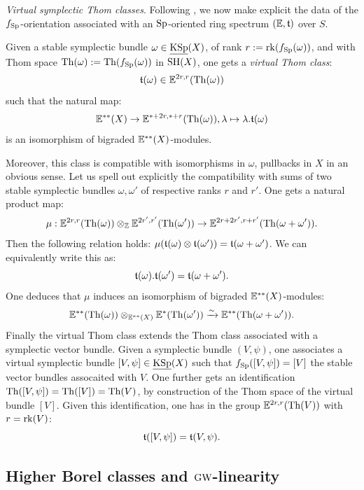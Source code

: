 \begin{num}\textit{Virtual symplectic Thom classes}.
Following ,
 we now make explicit the data of the $f_{\mathrm{Sp}}$-orientation
 associated with an $\mathrm{Sp}$-oriented ring spectrum $(\mathbb E,\mathfrak{t})$ over $S$.

Given a stable symplectic bundle $\omega \in \operatorname{\underline{KSp}}(X)$,
 of rank $r:=\operatorname{rk}(f_{\mathrm{Sp}}(\omega))$, and with Thom space $\operatorname{Th}(\omega):=\operatorname{Th}(f_{\mathrm{Sp}}(\omega))$ in $\operatorname{SH}(X)$,
 one gets a \emph{virtual Thom class}:
$$
\mathfrak{t}(\omega) \in \mathbb E^{2r,r}(\operatorname{Th}(\omega))
$$
such that the natural map:
$$
\mathbb E^{**}(X) \rightarrow \mathbb E^{*+2r,*+r}(\operatorname{Th}(\omega)), \lambda \mapsto \lambda.\mathfrak{t}(\omega)
$$
is an isomorphism of bigraded $\mathbb E^{**}(X)$-modules.

Moreover, this class is compatible with isomorphisms in $\omega$, pullbacks in $X$
 in an obvious sense. Let us spell out explicitly the compatibility with 
 sums of two stable symplectic bundles $\omega, \omega'$ of respective ranks $r$ and $r'$.
 One gets a natural product map:
$$
\mu:\mathbb E^{2r,r}(\operatorname{Th}(\omega)) \otimes_{\mathbb{Z}} \mathbb E^{2r',r'}(\operatorname{Th}(\omega'))
  \rightarrow \mathbb E^{2r+2r',r+r'}(\operatorname{Th}(\omega+\omega')).
$$
Then the following relation holds: $\mu(\mathfrak{t}(\omega) \otimes \mathfrak{t}(\omega'))=\mathfrak{t}(\omega+\omega')$.
 We can equivalently write this as:
$$
\mathfrak{t}(\omega).\mathfrak{t}(\omega')=\mathfrak{t}(\omega+\omega').
$$
One deduces that $\mu$ induces an isomorphism of bigraded $\mathbb E^{**}(X)$-modules:
$$
\mathbb E^{**}(\operatorname{Th}(\omega)) \otimes_{\mathbb E^{**}(X)} \mathbb E^{*}(\operatorname{Th}(\omega'))
 \xrightarrow \sim \mathbb E^{**}(\operatorname{Th}(\omega+\omega')).
$$
Finally the virtual Thom class extends the Thom class associated with
 a symplectic vector bundle. Given a symplectic bundle $(V,\psi)$,
 one associates a virtual symplectic bundle $[V,\psi] \in \operatorname{\underline{KSp}}(X)$
 such that $f_{\mathrm{Sp}}([V,\psi])=[V]$ the stable vector bundles assocaited with $V$.
 One further gets an identification $\operatorname{Th}([V,\psi])=\operatorname{Th}([V])=\operatorname{Th}(V)$,
 by construction of the Thom space of the virtual bundle $[V]$.
 Given this identification, one has in the group $\mathbb E^{2r,r}(\operatorname{Th}(V))$ with $r=\operatorname{rk}(V)$:
$$
\mathfrak{t}([V,\psi])=\mathfrak{t}(V,\psi).
$$
\end{num}



\subsection{Higher Borel classes and $\operatorname{GW}$-linearity}

